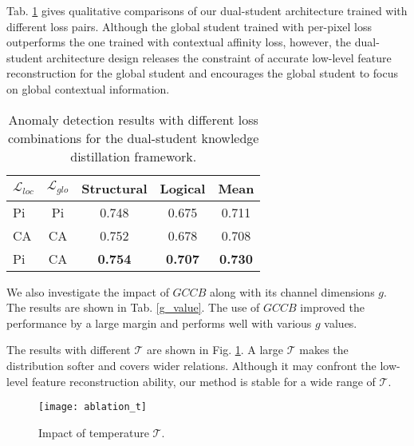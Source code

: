 \documentclass[10pt,twocolumn,letterpaper]{article}
\begin{document}
Tab. \ref{loss_pair} gives qualitative comparisons of our dual-student architecture trained with different loss pairs. Although the global student trained with per-pixel loss outperforms the one trained with contextual affinity loss, however, the dual-student architecture design releases the constraint of accurate low-level feature reconstruction for the global student and encourages the global student to focus on global contextual information.
\begin{table}[t]
\caption{Anomaly detection results with different loss combinations for the dual-student knowledge distillation framework. }
\centering
\begin{tabular}{lcccc}
\hline
$\mathcal{L}_{loc}$ & $\mathcal{L}_{glo}$ & Structural & Logical & Mean           \\ \hline
Pi    & Pi    & 0.748              & 0.675           & 0.711          \\
CA    & CA    & 0.752              & 0.678           & 0.708          \\
Pi    & CA    & \textbf{0.754}     & \textbf{0.707}  & \textbf{0.730} \\ \hline
\end{tabular}

\label{loss_pair}
\end{table}


We also investigate the impact of $GCCB$ along with its channel dimensions $g$. The results are shown in Tab. \ref{g_value}. The use of $GCCB$ improved the performance by a large margin and performs well with various $g$ values.
\begin{table}[t]
\caption{Mean detection results with different $g$ dimension values. "w/o" means $GCCB$ is not used and 
 for $g = 2048$ channels, we do not use $conv 1 \times 1$ layers to downsample and upsample the channel dimensions.}
\centering
{}

\label{g_value}
\end{table}

The results with different $\mathcal{T}$ are shown in Fig. \ref{fig_t}. A large $\mathcal{T}$ makes the distribution softer and covers wider relations. Although it may confront the low-level feature reconstruction ability, our method is stable for a wide range of $\mathcal{T}$.
\begin{figure}
  \centering
    \texttt{[image: ablation\_t]}
  \caption{Impact of temperature $\mathcal{T}$.}
    \label{fig_t}
\end{figure}
\end{document}
